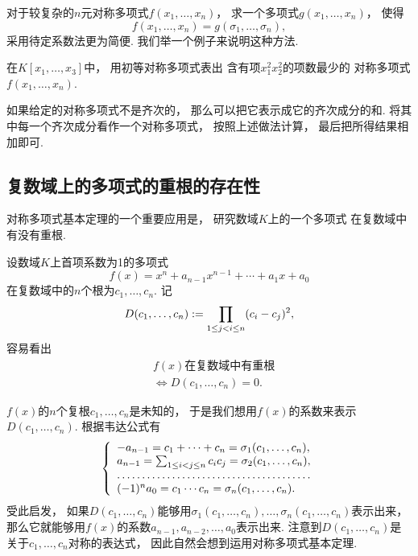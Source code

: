 对于较复杂的\(n\)元对称多项式\(f(x_1,\dotsc,x_n)\)，
求一个多项式\(g(x_1,\dotsc,x_n)\)，
使得\begin{equation*}
	f(x_1,\dotsc,x_n)
	=g(\sigma_1,\dotsc,\sigma_n),
\end{equation*}
采用待定系数法更为简便.
我们举一个例子来说明这种方法.

\begin{example}
在\(K[x_1,\dotsc,x_3]\)中，
用初等对称多项式表出
含有项\(x_1^2 x_2^2\)的项数最少的
对称多项式\(f(x_1,\dotsc,x_n)\).
\end{example}

如果给定的对称多项式不是齐次的，
那么可以把它表示成它的齐次成分的和.
将其中每一个齐次成分看作一个对称多项式，
按照上述做法计算，
最后把所得结果相加即可.

\subsection{复数域上的多项式的重根的存在性}
对称多项式基本定理的一个重要应用是，
研究数域\(K\)上的一个多项式
在复数域中有没有重根.

设数域\(K\)上首项系数为1的多项式\begin{equation*}
	f(x)=x^n+a_{n-1} x^{n-1}+\dotsb+a_1 x+a_0
\end{equation*}在复数域中的\(n\)个根为\(c_1,\dotsc,c_n\).
记\begin{equation*}
	D(c_1,\dotsc,c_n)
	:=
	\prod_{1\leq j<i\leq n} (c_i-c_j)^2,
\end{equation*}
容易看出\begin{align*}
	&\text{$f(x)$在复数域中有重根} \\
	&\iff
	D(c_1,\dotsc,c_n)=0.
\end{align*}

\(f(x)\)的\(n\)个复根\(c_1,\dotsc,c_n\)是未知的，
于是我们想用\(f(x)\)的系数来表示\(D(c_1,\dotsc,c_n)\).
根据韦达公式有\begin{equation*}
	\left\{ \begin{array}{l}
		-a_{n-1}
		=c_1+\dotsb+c_n
		=\sigma_1(c_1,\dotsc,c_n), \\
		a_{n-1}
		=\sum_{1\leq i<j\leq n} c_i c_j
		=\sigma_2(c_1,\dotsc,c_n), \\
		\hdotsfor1 \\
		(-1)^n a_0
		=c_1 \dotsm c_n
		=\sigma_n(c_1,\dotsc,c_n).
	\end{array} \right.
\end{equation*}
受此启发，
如果\(D(c_1,\dotsc,c_n)\)能够用\(\sigma_1(c_1,\dotsc,c_n),
\dotsc,
\sigma_n(c_1,\dotsc,c_n)\)表示出来，
那么它就能够用\(f(x)\)的系数\(a_{n-1},a_{n-2},\dotsc,a_0\)表示出来.
注意到\(D(c_1,\dotsc,c_n)\)是关于\(c_1,\dotsc,c_n\)对称的表达式，
因此自然会想到运用对称多项式基本定理.

